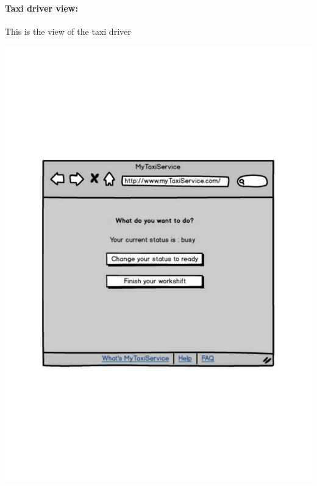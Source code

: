 \paragraph{Taxi driver view:}
This is the view of the taxi driver
\begin{center}
	\includegraphics[width=\textwidth]{mockup/taxiDriverFunctions.pdf}
\end{center}

